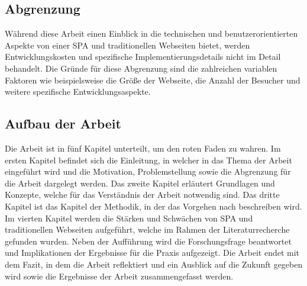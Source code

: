 \subsection{Abgrenzung}
Während diese Arbeit einen Einblick in die technischen und benutzerorientierten Aspekte von einer \ac{SPA} und traditionellen Webseiten bietet, werden Entwicklungskosten und spezifische Implementierungsdetails nicht im Detail behandelt.
Die Gründe für diese Abgrenzung sind die zahlreichen variablen Faktoren wie beispielsweise die Größe der Webseite, die Anzahl der Besucher und weitere spezifische Entwicklungsaspekte.

\subsection{Aufbau der Arbeit}
Die Arbeit ist in fünf Kapitel unterteilt, um den roten Faden zu wahren.
Im ersten Kapitel befindet sich die Einleitung, in welcher in das Thema der Arbeit eingeführt wird und die Motivation, Problemstellung sowie die Abgrenzung für die Arbeit dargelegt werden.
Das zweite Kapitel erläutert Grundlagen und Konzepte, welche für das Verständnis der Arbeit notwendig sind.
Das dritte Kapitel ist das Kapitel der Methodik, in der das Vorgehen nach  beschreiben wird.
Im vierten Kapitel werden die Stärken und Schwächen von \ac{SPA} und traditionellen Webseiten aufgeführt, welche im Rahmen der Literaturrecherche gefunden wurden.
Neben der Aufführung wird die Forschungsfrage beantwortet und Implikationen der Ergebnisse für die Praxis aufgezeigt.
Die Arbeit endet mit dem Fazit, in dem die Arbeit reflektiert und ein Ausblick auf die Zukunft gegeben wird sowie die Ergebnisse der Arbeit zusammengefasst werden.
